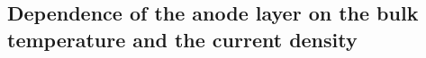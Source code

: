 \subsection{Dependence of the anode layer on the bulk temperature and the current density}
\label{sec:res-anode-sweep}

